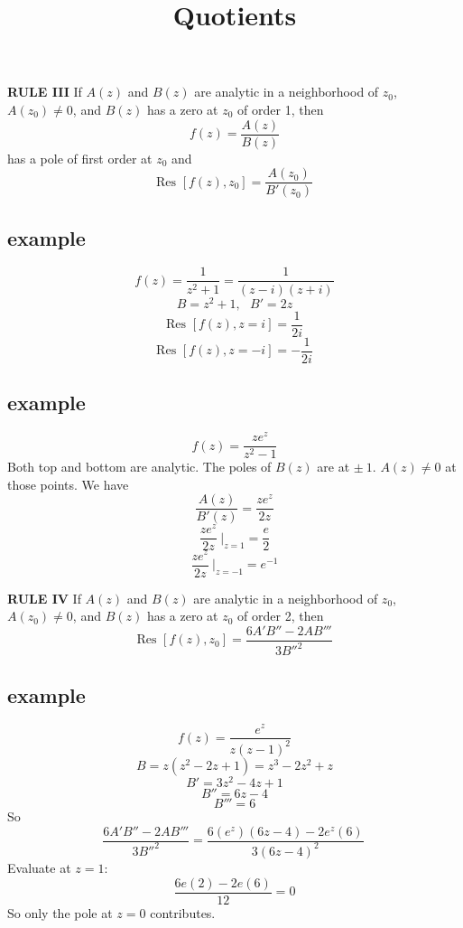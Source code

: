 \documentclass[11pt, oneside]{article}
\title{Quotients}
\date{}
\begin{document}
\maketitle
\Large




\textbf{RULE III}  If $A(z)$ and $B(z)$ are analytic in a neighborhood of $z_0$, $A(z_0) \ne 0$, and $B(z)$ has a zero at $z_0$ of order 1, then
\[ f(z) = \frac{A(z)}{B(z)} \]
has a pole of first order at $z_0$ and
\[ \text{Res } [f(z),z_0] = \frac{A(z_0)}{B'(z_0)} \]
\subsection*{example}
\[ f(z) = \frac{1}{z^2 + 1} = \frac{1}{(z - i)(z + i)} \]
\[ B = z^2 + 1, \ \ \ B' = 2z \]
\[ \text{Res } [f(z),z=i] = \frac{1}{2i} \]
\[ \text{Res } [f(z),z=-i] = -\frac{1}{2i} \]

\subsection*{example}
\[ f(z) = \frac{z e^z}{z^2 - 1} \]
Both top and bottom are analytic.  The poles of $B(z)$ are at $\pm \ 1$.  $A(z) \ne 0$ at those points.  We have 
\[ \frac{A(z)}{B'(z)} = \frac{z e^z}{2z} \]
\[ \frac{z e^z}{2z} \ \bigg |_{z=1} = \frac{e}{2} \]
\[ \frac{z e^z}{2z} \ \bigg |_{z=-1} = e^{-1} \]

\textbf{RULE IV}  If $A(z)$ and $B(z)$ are analytic in a neighborhood of $z_0$, $A(z_0) \ne 0$, and $B(z)$ has a zero at $z_0$ of order 2, then
\[ \text{Res } [f(z),z_0] = \frac{6A' B'' - 2AB'''}{3B''^2} \]

\subsection*{example}
\[ f(z) = \frac{e^z}{z(z-1)^2} \]
\[ B = z(z^2 - 2z + 1) = z^3 - 2z^2 + z \]
\[ B' = 3z^2 - 4z + 1 \]
\[ B'' = 6z - 4 \]
\[ B''' = 6 \]
So
\[ \frac{6A' B'' - 2AB'''}{3B''^2} = \frac{6(e^z)(6z-4) - 2e^z(6)}{3(6z-4)^2} \ \]
Evaluate at $z=1$:
\[ \frac{6e(2) - 2e(6)}{12} = 0 \]
So only the pole at $z=0$ contributes.
\end{document}
